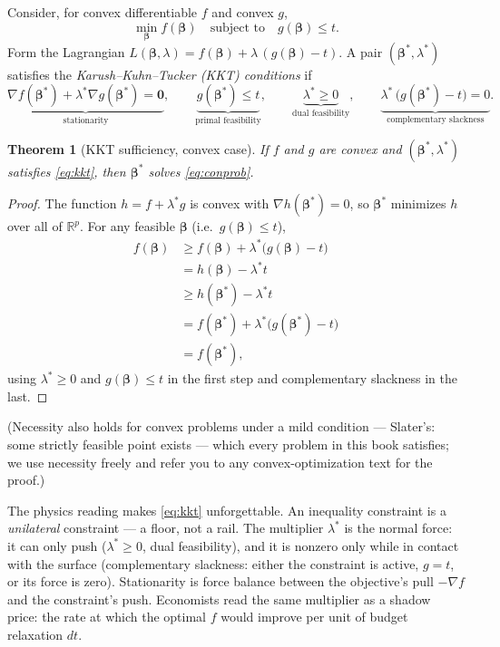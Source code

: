 \documentclass[11pt]{article}
\numberwithin{equation}{section}
\theoremstyle{plain}
\newtheorem{theorem}{Theorem}[section]
\theoremstyle{definition}
\theoremstyle{remark}
\newcommand{\R}{\mathbb{R}}
\newcommand{\bbeta}{\bm{\beta}}
\begin{document}
Consider, for convex differentiable $f$ and convex $g$,
\begin{equation}
\min_{\bbeta} f(\bbeta) \quad \text{subject to} \quad g(\bbeta) \le t .
\label{eq:conprob}
\end{equation}
Form the Lagrangian $L(\bbeta, \lambda) = f(\bbeta) + \lambda\,(g(\bbeta) - t)$. A pair $(\bbeta^\ast, \lambda^\ast)$ satisfies the \emph{Karush--Kuhn--Tucker (KKT) conditions} if
\begin{equation}
\underbrace{\nabla f(\bbeta^\ast) + \lambda^\ast \nabla g(\bbeta^\ast) = \bm{0}}_{\text{stationarity}},
\qquad
\underbrace{g(\bbeta^\ast) \le t}_{\text{primal feasibility}},
\qquad
\underbrace{\lambda^\ast \ge 0}_{\text{dual feasibility}},
\qquad
\underbrace{\lambda^\ast\,\big(g(\bbeta^\ast) - t\big) = 0}_{\text{complementary slackness}}.
\label{eq:kkt}
\end{equation}

\begin{theorem}[KKT sufficiency, convex case]\label{thm:kkt}
If $f$ and $g$ are convex and $(\bbeta^\ast, \lambda^\ast)$ satisfies \eqref{eq:kkt}, then $\bbeta^\ast$ solves \eqref{eq:conprob}.
\end{theorem}
\begin{proof}
The function $h = f + \lambda^\ast g$ is convex with $\nabla h(\bbeta^\ast) = 0$, so $\bbeta^\ast$ minimizes $h$ over all of $\R^{p}$. For any feasible $\bbeta$ (i.e.\ $g(\bbeta) \le t$),
\begin{align*}
f(\bbeta)
&\ge f(\bbeta) + \lambda^\ast\big(g(\bbeta) - t\big)\\
&= h(\bbeta) - \lambda^\ast t\\
&\ge h(\bbeta^\ast) - \lambda^\ast t\\
&= f(\bbeta^\ast) + \lambda^\ast\big(g(\bbeta^\ast) - t\big)\\
&= f(\bbeta^\ast),
\end{align*}
using $\lambda^\ast \ge 0$ and $g(\bbeta)\le t$ in the first step and complementary slackness in the last.
\end{proof}

(Necessity also holds for convex problems under a mild condition --- Slater's: some strictly feasible point exists --- which every problem in this book satisfies; we use necessity freely and refer you to any convex-optimization text for the proof.)

The physics reading makes \eqref{eq:kkt} unforgettable. An inequality constraint is a \emph{unilateral} constraint --- a floor, not a rail. The multiplier $\lambda^\ast$ is the normal force: it can only push ($\lambda^\ast \ge 0$, dual feasibility), and it is nonzero only while in contact with the surface (complementary slackness: either the constraint is active, $g = t$, or its force is zero). Stationarity is force balance between the objective's pull $-\nabla f$ and the constraint's push. Economists read the same multiplier as a shadow price: the rate at which the optimal $f$ would improve per unit of budget relaxation $dt$.
\end{document}
